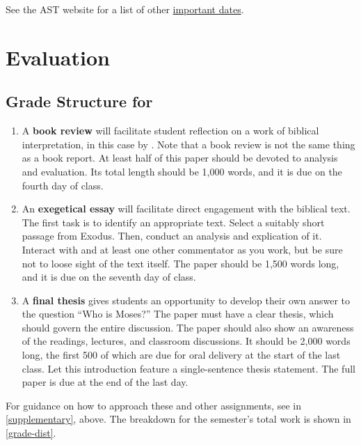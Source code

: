 \documentclass[titlepage]{article}
\begin{document}
See the AST website for a list of other \href{http://www.astheology.ns.ca/students/academic-dates.html}{important dates}.

\section{Evaluation}
\label{evaluation}

\subsection{Grade Structure for \ccode}
\label{structure}

\begin{enumerate}

	\item A \textbf{book review} will facilitate student reflection on a
	work of biblical interpretation, in this case by \cite{vonrad}. Note
	that a book review is not the same thing as a book report. At least
	half of this paper should be devoted to analysis and evaluation. Its
	total length should be 1,000 words, and it is due on the fourth day
	of class.

	\item An \textbf{exegetical essay} will facilitate direct engagement
	with the biblical text. The first task is to identify an appropriate
	text. Select a suitably short passage from Exodus. Then, conduct an
	analysis and explication of it. Interact with \cite{childs} and at
	least one other commentator as you work, but be sure not to loose
	sight of the text itself. The paper should be 1,500 words long, and
	it is due on the seventh day of class.

	\item A \textbf{final thesis} gives students an opportunity to
	develop their own answer to the question “Who is Moses?” The paper
	must have a clear thesis, which should govern the entire discussion.
	The paper should also show an awareness of the readings, lectures,
	and classroom discussions. It should be 2,000 words long, the first
	500 of which are due for oral delivery at the start of the last
	class. Let this introduction feature a single-sentence thesis
	statement. The full paper is due at the end of the last day.

\end{enumerate}

For guidance on how to approach these and other assignments, see
\cite{rlgs} in \autoref{supplementary}, above. The breakdown for the
semester's total work is shown in \autoref{grade-dist}.
\end{document}
